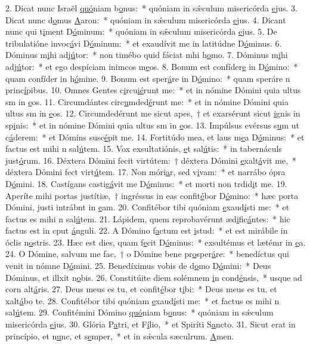 2. Dicat nunc Israël \uline{quó}niam b\uline{o}nus:~* quóniam in sǽculum misericórda \uline{e}jus.
3. Dicat nunc d\uline{o}mus \uline{A}aron:~* quóniam in sǽculum misericórda \uline{e}jus.
4. Dicant nunc qui t\uline{i}ment D\uline{ó}minum:~* quóniam in sǽculum misericórda \uline{e}jus.
5. De tribulatióne invoc\uline{á}vi D\uline{ó}minum:~* et exaudívit me in latitúdne D\uline{ó}minus.
6. Dóminus m\uline{i}hi adj\uline{ú}tor:~* non timébo quid fáciat mhi h\uline{o}mo.
7. Dóminus m\uline{i}hi adj\uline{ú}tor:~* et ego despíciam inimcos m\uline{e}os.
8. Bonum est confíder\uline{e} in D\uline{ó}mino:~* quam confíder in h\uline{ó}mine.
9. Bonum est sper\uline{á}re in D\uline{ó}mino:~* quam speráre n princ\uline{í}pibus.
10. Omnes Gentes c\uline{i}rcu\uline{ié}runt me:~* et in nómine Dómini quia ultus sm in \uline{e}os.
11. Circumdántes circ\uline{u}mded\uline{é}runt me:~* et in nómine Dómini quia ultus sm in \uline{e}os.
12. Circumdedérunt me sicut apes,~† et exarsérunt sicut \uline{i}gnis in sp\uline{i}nis:~* et in nómine Dómini quia ultus sm in \uline{e}os.
13. Impúlsus evérsus s\uline{u}m ut c\uline{á}derem:~* et Dómins susc\uline{é}pit me.
14. Fortitúdo mea, et laus m\uline{e}a D\uline{ó}minus:~* et factus est mihi n sal\uline{ú}tem.
15. Vox exsultatiónis, \uline{e}t sal\uline{ú}tis:~* in tabernáculs just\uline{ó}rum.
16. Déxtera Dómini fecit virtútem:~† déxtera Dómini \uline{e}xalt\uline{á}vit me,~* déxtera Dómini fect virt\uline{ú}tem.
17. Non móri\uline{a}r, sed v\uline{i}vam:~* et narrábo ópra D\uline{ó}mini.
18. Castígans castig\uline{á}vit me D\uline{ó}minus:~* et morti non trdid\uline{i}t me.
19. Aperíte mihi portas justítiæ,~† ingréssus in eas confit\uline{é}bor D\uline{ó}mino:~* hæc porta Dómini, justi intrábnt in \uline{e}am.
20. Confitébor tibi quóniam \uline{e}xaud\uline{í}sti me:~* et factus es mihi n sal\uline{ú}tem.
21. Lápidem, quem reprobavérunt æd\uline{i}fic\uline{á}ntes:~* hic factus est in cput \uline{á}nguli.
22. A Dómino f\uline{a}ctum est \uline{i}stud:~* et est mirábile in óclis n\uline{o}stris.
23. Hæc est dies, quam f\uline{e}cit D\uline{ó}minus:~* exsultémus et lætémr in \uline{e}a.
24. O Dómine, salvum me fac,~† o Dómine bene pr\uline{o}sper\uline{á}re:~* benedíctus qui venit in nómne D\uline{ó}mini.
25. Benedíximus vobis de d\uline{o}mo D\uline{ó}mini:~* Deus Dóminus, et illxit n\uline{o}bis.
26. Constitúite diem solémnem \uline{i}n cond\uline{é}nsis,~* usque ad corn alt\uline{á}ris.
27. Deus meus es tu, et confit\uline{é}bor t\uline{i}bi:~* Deus meus es tu, et xalt\uline{á}bo te.
28. Confitébor tibi quóniam \uline{e}xaud\uline{í}sti me:~* et factus es mihi n sal\uline{ú}tem.
29. Confitémini Dómino \uline{quó}niam b\uline{o}nus:~* quóniam in sǽculum misericórda \uline{e}jus.
30. Glória P\uline{a}tri, et F\uline{í}lio,~* et Spiríti S\uline{a}ncto.
31. Sicut erat in princípio, et n\uline{u}nc, et s\uline{e}mper,~* et in sǽcula sæculrum. \uline{A}men.
